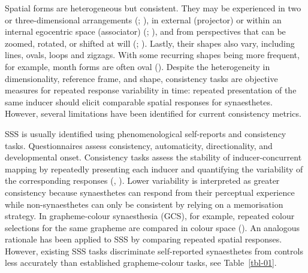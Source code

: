 \documentclass[
  man,
  floatsintext,
  longtable,
  nolmodern,
  notxfonts,
  notimes,
  colorlinks=true,linkcolor=blue,citecolor=blue,urlcolor=blue]{apa7}
\begin{document}
Spatial forms are heterogeneous but consistent. They may be experienced
in two or three-dimensional arrangements
(;
), in external
(projector) or within an internal egocentric space (associator)
(;
), and from perspectives
that can be zoomed, rotated, or shifted at will
(;
). Lastly, their shapes
also vary, including lines, ovals, loops and zigzags. With some
recurring shapes being more frequent, for example, month forms are often
oval (). Despite the
heterogeneity in dimensionality, reference frame, and shape, consistency
tasks are objective measures for repeated response variability in time:
repeated presentation of the same inducer should elicit comparable
spatial responses for synaesthetes. However, several limitations have
been identified for current consistency metrics.

SSS is usually identified using phenomenological self-reports and
consistency tasks. Questionnaires assess consistency, automaticity,
directionality, and developmental onset. Consistency tasks assess the
stability of inducer-concurrent mapping by repeatedly presenting each
inducer and quantifying the variability of the corresponding responses
(,
). Lower variability is interpreted as
greater consistency because synaesthetes can respond from their
perceptual experience while non-synaesthetes can only be consistent by
relying on a memorisation strategy. In grapheme-colour synaesthesia
(GCS), for example, repeated colour selections for the same grapheme are
compared in colour space (). An analogous rationale has been applied to SSS by comparing
repeated spatial responses. However, existing SSS tasks discriminate
self-reported synaesthetes from controls less accurately than
established grapheme-colour tasks, see Table~\ref{tbl-01}.
\end{document}
